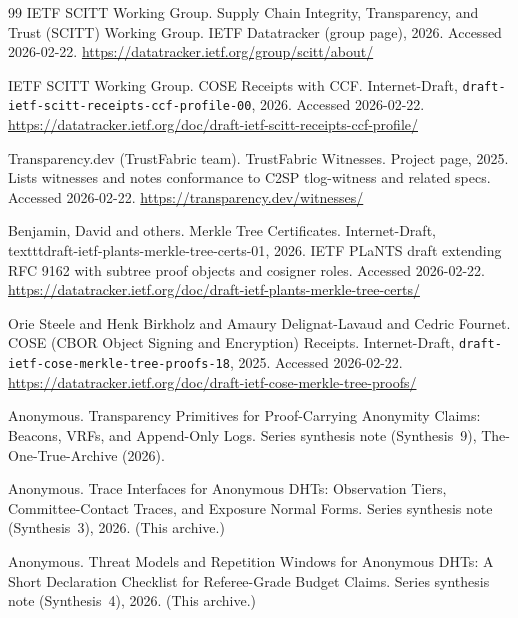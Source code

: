 \documentclass[11pt]{article}
\begin{document}
\begin{thebibliography}{99}
{IETF SCITT Working Group}.
\newblock Supply Chain Integrity, Transparency, and Trust ({SCITT}) Working Group.
\newblock IETF Datatracker (group page), 2026.
\newblock Accessed 2026-02-22.
\newblock \url{https://datatracker.ietf.org/group/scitt/about/}

{IETF SCITT Working Group}.
\newblock COSE Receipts with CCF.
\newblock Internet-Draft, \texttt{draft-ietf-scitt-receipts-ccf-profile-00}, 2026.
\newblock Accessed 2026-02-22.
\newblock \url{https://datatracker.ietf.org/doc/draft-ietf-scitt-receipts-ccf-profile/}

{Transparency.dev (TrustFabric team)}.
\newblock TrustFabric Witnesses.
\newblock Project page, 2025.
\newblock Lists witnesses and notes conformance to C2SP tlog-witness and related specs. Accessed 2026-02-22.
\newblock \url{https://transparency.dev/witnesses/}

Benjamin, David and others.
\newblock Merkle Tree Certificates.
\newblock Internet-Draft, \\texttt{draft-ietf-plants-merkle-tree-certs-01}, 2026.
\newblock IETF PLaNTS draft extending RFC 9162 with subtree proof objects and cosigner roles. Accessed 2026-02-22.
\newblock \url{https://datatracker.ietf.org/doc/draft-ietf-plants-merkle-tree-certs/}

Orie Steele and Henk Birkholz and Amaury Delignat-Lavaud and Cedric Fournet.
\newblock COSE (CBOR Object Signing and Encryption) Receipts.
\newblock Internet-Draft, \texttt{draft-ietf-cose-merkle-tree-proofs-18}, 2025.
\newblock Accessed 2026-02-22.
\newblock \url{https://datatracker.ietf.org/doc/draft-ietf-cose-merkle-tree-proofs/}


Anonymous.
\newblock Transparency Primitives for Proof-Carrying Anonymity Claims: Beacons, VRFs, and Append-Only Logs.
\newblock Series synthesis note (Synthesis~9), The-One-True-Archive (2026).

Anonymous.
\newblock Trace Interfaces for Anonymous DHTs: Observation Tiers, Committee-Contact Traces, and Exposure Normal Forms.
\newblock Series synthesis note (Synthesis~3), 2026. (This archive.)

Anonymous.
\newblock Threat Models and Repetition Windows for Anonymous DHTs: A Short Declaration Checklist for Referee-Grade Budget Claims.
\newblock Series synthesis note (Synthesis~4), 2026. (This archive.)


\end{thebibliography}
\end{document}
